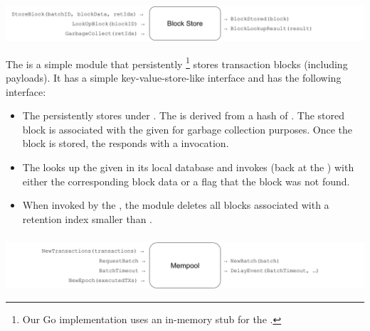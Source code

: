 \documentclass{article}
\begin{document}
\subsubsection{}

\includegraphics[width=\textwidth]{figures/modules/module-block-store.pdf}

The  is a simple module that persistently%
\footnote{Our Go implementation uses an in-memory stub for the .}
stores transaction blocks (including payloads).
It has a simple key-value-store-like interface and has the following interface:

\begin{itemize}
    \item {}
    The  persistently stores  under .
    The  is derived from a hash of .
    The stored block is associated with the given  for garbage collection purposes.
    Once the block is stored, the  responds with a  invocation.

    \item {}
    The  looks up the given  in its local database and invokes  (back at the )
    with either the corresponding block data or a flag that the block was not found.
    
    \item {}
    When invoked by the , the  module deletes all blocks associated with a retention index smaller than .
    
\end{itemize}

\subsubsection{}
\label{sec:module-mempool}

\includegraphics[width=\textwidth]{figures/modules/module-mempool.pdf}
\end{document}
